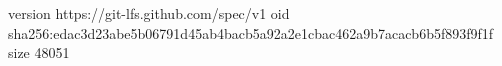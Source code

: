 version https://git-lfs.github.com/spec/v1
oid sha256:edac3d23abe5b06791d45ab4bacb5a92a2e1cbac462a9b7acacb6b5f893f9f1f
size 48051
